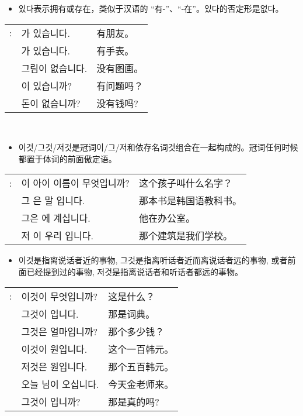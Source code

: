 \begin{grammar}
    \begin{grammarsect}[있다]
        \begin{itemize}
            \item 있다表示拥有或存在，类似于汉语的 “有-”、“-在”。있다的否定形是없다。
        \end{itemize}
        \begin{tabular}{lll}
            \ruby{例}{예}: &\ruby{親舊}{친구}가 있습니다. &有朋友。\\
            &\ruby{時計}{시계}가 있습니다. &有手表。\\
            &그림이 없습니다. &没有图画。\\
            &\ruby{質問}{질문}이 있습니까? &有问题吗？\\
            &돈이 없습니까? &没有钱吗?
        \end{tabular}\\
    \end{grammarsect}
\end{grammar}
\begin{grammar}
    \begin{grammarsect}[이것/그것/저것]
    \begin{itemize}
        \item 이것/그것/저것是冠词이/그/저和依存名词것组合在一起构成的。冠词任何时候都置于体词的前面傲定语。
    \end{itemize}
    \begin{tabular}{lll}
        \ruby{例}{예}: &이 아이 이름이 무엇입니까?&这个孩子叫什么名字？\\
        &그 \ruby{冊}{책}은 \ruby{韓國}{한국}말 \ruby{敎科書}{교과서}입니다.&那本书是韩国语教科书。\\
        &그\ruby{分}{분}은 \ruby{事務室}{사무실}에 계십니다.&他在办公室。\\
        &저 \ruby{建物}{건물}이 우리 \ruby{學校}{학교}입니다.&那个建筑是我们学校。\\
    \end{tabular}
    \begin{itemize}
        \item 이것是指离说话者近的事物, 그것是指离听话者近而离说话者远的事物, 或者前面已经提到过的事物, 저것是指离说话者和听话者都远的事物。
    \end{itemize}
    \begin{tabular}{lll}
        \ruby{例}{예}: &이것이 무엇입니까?&这是什么？\\
        &그것이 \ruby{辭典}{사전}입니다.&那是词典。\\
        &그것은 얼마입니까?&那个多少钱？\\
        &이것이 \ruby{百}{백} 원입니다.&这个一百韩元。\\
        &저것은 \ruby{五百}{오백} 원입니다.&那个五百韩元。\\
        &오늘 \ruby{金}{김} \ruby{先生}{선생}님이 오십니다.&今天金老师来。\\
        &그것이 \ruby{事實}{사실}입니까?&那是真的吗?
    \end{tabular}\\
    \end{grammarsect}
\end{grammar}
